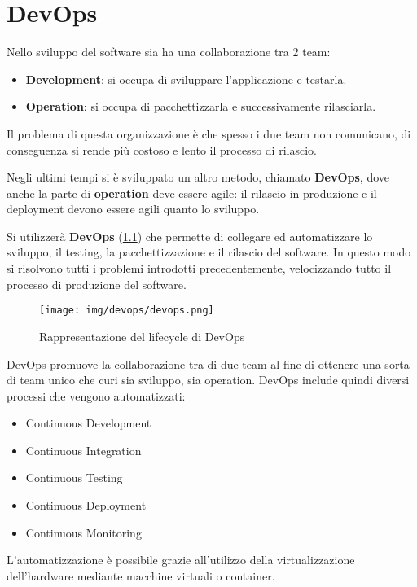 \chapter{DevOps}
Nello sviluppo del software sia ha una collaborazione tra 2 team:
\begin{itemize}
      \item \textbf{Development}: si occupa di sviluppare l'applicazione e
            testarla.
      \item \textbf{Operation}: si occupa di pacchettizzarla e successivamente
            rilasciarla.
\end{itemize}
Il problema di questa organizzazione è che spesso i due team non comunicano, di
conseguenza si rende più costoso e lento il processo di rilascio.

Negli ultimi tempi si è sviluppato un altro metodo, chiamato \textbf{DevOps},
dove anche la parte di \textbf{operation} deve essere agile: il rilascio in
produzione e il deployment devono essere agili quanto lo sviluppo.

Si utilizzerà \textbf{DevOps} (\ref{fig:devops}) che permette di collegare ed
automatizzare lo sviluppo, il testing, la pacchettizzazione e il rilascio del
software. In questo modo si risolvono tutti i problemi introdotti precedentemente,
velocizzando tutto il processo di produzione del software.
\begin{figure}[!ht]
      \centering
      \texttt{[image: img/devops/devops.png]}
      \caption{Rappresentazione del lifecycle di DevOps}
      \label{fig:devops}
\end{figure}
DevOps promuove la collaborazione tra di due team al fine di ottenere una sorta
di team unico che curi sia sviluppo, sia operation. DevOps include quindi diversi
processi che vengono automatizzati:
\begin{itemize}
      \item Continuous Development
      \item Continuous Integration
      \item Continuous Testing
      \item Continuous Deployment
      \item Continuous Monitoring
\end{itemize}
L'automatizzazione è possibile grazie all'utilizzo della virtualizzazione
dell'hardware mediante macchine virtuali o container.

